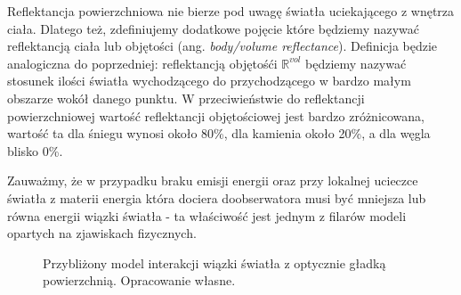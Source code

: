 \documentclass[../main.tex]{subfiles}
\begin{document}
Reflektancja powierzchniowa nie bierze pod uwagę światła uciekającego z wnętrza ciała. Dlatego też, zdefiniujemy dodatkowe pojęcie które będziemy nazywać reflektancją ciała lub objętości (ang. \textit{body/volume reflectance}). Definicja będzie analogiczna do poprzedniej: reflektancją objętośći $\mathbb{R}^{\textit{vol}}$ będziemy nazywać stosunek ilości światła wychodzącego do przychodzącego w bardzo małym obszarze wokół danego punktu. W przeciwieństwie do reflektancji powierzchniowej wartość reflektancji objętościowej jest bardzo zróżnicowana, wartość ta dla śniegu wynosi około 80\%, dla kamienia około 20\%, a dla węgla blisko 0\%.

Zauważmy, że w przypadku braku emisji energii oraz przy lokalnej ucieczce światła z materii energia która dociera doobserwatora musi być mniejsza lub równa energii wiązki światła - ta właściwość jest jednym z filarów modeli opartych na zjawiskach fizycznych.

\begin{figure}[ht]
  \centering
  \caption{Przybliżony model interakcji wiązki światła z optycznie gładką powierzchnią. Opracowanie własne.}
  \label{fig:ReflectionRefractionDetailed}
\end{figure}
\end{document}
